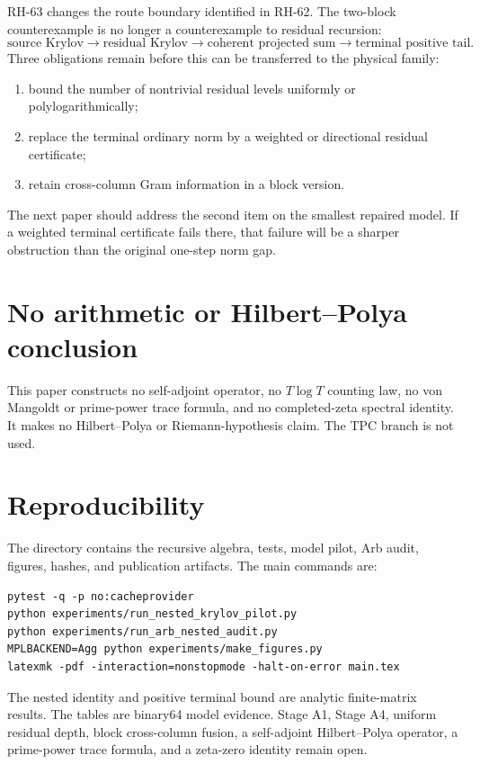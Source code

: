 \documentclass[11pt]{article}
\begin{document}
RH-63 changes the route boundary identified in RH-62.  The two-block
counterexample is no longer a counterexample to residual recursion:
\begin{equation}
\text{source Krylov}
\longrightarrow
\text{residual Krylov}
\longrightarrow
\text{coherent projected sum}
\longrightarrow
\text{terminal positive tail}.
\label{eq:route}
\end{equation}
Three obligations remain before this can be transferred to the physical
family:

\begin{enumerate}[leftmargin=2.2em]
 \item bound the number of nontrivial residual levels uniformly or
       polylogarithmically;
 \item replace the terminal ordinary norm by a weighted or directional
       residual certificate;
 \item retain cross-column Gram information in a block version.
\end{enumerate}

The next paper should address the second item on the smallest repaired
model.  If a weighted terminal certificate fails there, that failure will be
a sharper obstruction than the original one-step norm gap.

\section{No arithmetic or Hilbert--Polya conclusion}

This paper constructs no self-adjoint operator, no $T\log T$ counting law,
no von Mangoldt or prime-power trace formula, and no completed-zeta
spectral identity.  It makes no Hilbert--Polya or Riemann-hypothesis claim.
The TPC branch is not used.

\section{Reproducibility}

The directory contains the recursive algebra, tests, model pilot, Arb audit,
figures, hashes, and publication artifacts.  The main commands are:
\begin{verbatim}
pytest -q -p no:cacheprovider
python experiments/run_nested_krylov_pilot.py
python experiments/run_arb_nested_audit.py
MPLBACKEND=Agg python experiments/make_figures.py
latexmk -pdf -interaction=nonstopmode -halt-on-error main.tex
\end{verbatim}

The nested identity and positive terminal bound are analytic finite-matrix
results.  The tables are binary64 model evidence.  Stage A1, Stage A4,
uniform residual depth, block cross-column fusion, a self-adjoint
Hilbert--Polya operator, a prime-power trace formula, and a zeta-zero
identity remain open.



\end{document}
